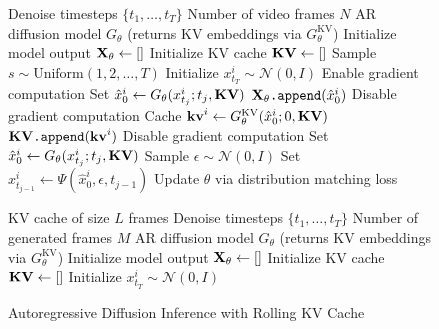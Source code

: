 \begin{figure}[t!]
\begin{minipage}[t]{0.48\textwidth}
  \begin{algorithm}[H]
    \caption{Self Forcing Training}
    \small
    \begin{algorithmic}[1]
      \Require Denoise timesteps $\{t_1, \dots, t_T\}$
      \Require Number of video frames $N$
      \Require AR diffusion model $G_\theta$ (returns KV embeddings via $G_\theta^{\mathrm{KV}}$)
      \Loop
        \State Initialize model output $\mathbf{X}_{\theta} \gets []$
        \State Initialize KV cache $\mathbf{KV} \gets []$
        \State Sample $s \sim \text{Uniform}(1, 2, \ldots, T)$
          \State Initialize $x^i_{t_T} \sim \mathcal{N}(0, I)$
              \State Enable gradient computation
              \State Set $\hat{x}^i_{0} \gets G_\theta(x^i_{t_{j}}; t_j, \mathbf{KV})$
              \State $\mathbf{X}_{\theta}{\texttt{.append}}(\hat x^i_{0})$
              \State Disable gradient computation
              \State Cache $\mathbf{kv}^i \gets G_\theta^\text{KV}(\hat{x}^i_{0}; 0, \mathbf{KV})$
              \State $\mathbf{KV}{\texttt{.append}}(\mathbf{kv}^i)$
            \Else
              \State Disable gradient computation
              \State Set $\hat{x}^i_{0} \gets G_\theta(x^i_{t_j}; t_j, \mathbf{KV})$
              \State Sample $\epsilon \sim \mathcal{N}(0, I)$
              \State Set $x^i_{t_{j-1}} \gets \Psi(\hat{x}^i_0, \epsilon, t_{j-1})$
            \EndIf
          \EndFor
        \EndFor
        \State Update $\theta$ via distribution matching loss
      \EndLoop
    \end{algorithmic}
    \label{alg:self_forcing}
  \end{algorithm}
\end{minipage}
\hfill
\begin{minipage}[t]{0.48\textwidth}
  \begin{algorithm}[H]
    \caption{Autoregressive Diffusion Inference with Rolling KV Cache}
    \small
    \begin{algorithmic}[1]
      \Require KV cache of size $L$ frames
      \Require Denoise timesteps $\{t_1, \dots, t_T\}$
      \Require Number of generated frames $M$
      \Require AR diffusion model $G_\theta$ (returns KV embeddings via $G_\theta^\text{KV}$)
      \State Initialize model output $\mathbf{X}_{\theta} \gets []$
      \State Initialize KV cache $\mathbf{KV} \gets []$
        \State Initialize $x^i_{t_T} \sim \mathcal{N}(0, I)$

\end{algorithmic}
\end{algorithm}
\end{minipage}
\end{figure}
